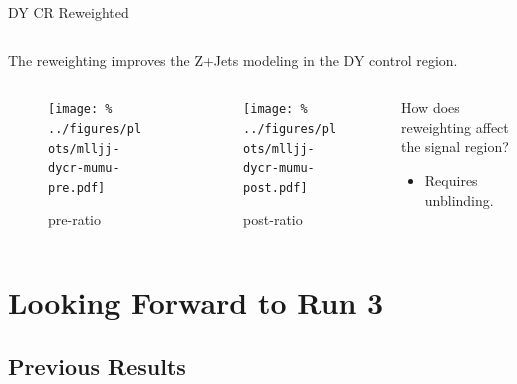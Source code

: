 \documentclass[aspectratio=169]{beamer}
\begin{document}
\begin{frame}{DY CR Reweighted}
  \begin{columns}
    \begin{column}{0.69\textwidth}
      \begin{block}{}
        \centering
        The reweighting improves the Z+Jets modeling in the DY control region.
      \end{block}
    \end{column}
    \begin{column}{0.3\textwidth}
      \centering
      \resizebox{0.9\columnwidth}{!}{%
      
      }
    \end{column}
  \end{columns}
  \begin{columns}
    \begin{column}{0.35\textwidth}
      \begin{figure}
        \texttt{[image: \%
        ../figures/plots/mlljj-dycr-mumu-pre.pdf]}
        \caption{pre-ratio}
      \end{figure}
    \end{column}
    \begin{column}{0.35\textwidth}
      \begin{figure}
        \texttt{[image: \%
        ../figures/plots/mlljj-dycr-mumu-post.pdf]}
        \caption{post-ratio}
      \end{figure}
    \end{column}
    \begin{column}{0.3\textwidth}
      \begin{block}{}
        How does reweighting affect the signal region?
          \begin{itemize}
            \footnotesize
            \item Requires unblinding.
          \end{itemize}
      \end{block}
    \end{column}
  \end{columns}
\end{frame}

\section{Looking Forward to Run 3}
\subsection{Previous Results}
\end{document}
